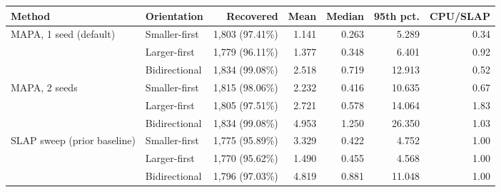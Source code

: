 \begin{tabular}{@{}llrrrrr@{}}\toprule
Method & Orientation & Recovered & Mean & Median & 95th pct. & CPU/SLAP\\\midrule
MAPA, 1 seed (default) & Smaller-first & 1,803 (97.41\%) & 1.141 & 0.263 & 5.289 & 0.34\\
 & Larger-first & 1,779 (96.11\%) & 1.377 & 0.348 & 6.401 & 0.92\\
 & Bidirectional & 1,834 (99.08\%) & 2.518 & 0.719 & 12.913 & 0.52\\
\midrule
MAPA, 2 seeds & Smaller-first & 1,815 (98.06\%) & 2.232 & 0.416 & 10.635 & 0.67\\
 & Larger-first & 1,805 (97.51\%) & 2.721 & 0.578 & 14.064 & 1.83\\
 & Bidirectional & 1,834 (99.08\%) & 4.953 & 1.250 & 26.350 & 1.03\\
\midrule
SLAP sweep (prior baseline) & Smaller-first & 1,775 (95.89\%) & 3.329 & 0.422 & 4.752 & 1.00\\
 & Larger-first & 1,770 (95.62\%) & 1.490 & 0.455 & 4.568 & 1.00\\
 & Bidirectional & 1,796 (97.03\%) & 4.819 & 0.881 & 11.048 & 1.00\\
\bottomrule\end{tabular}
